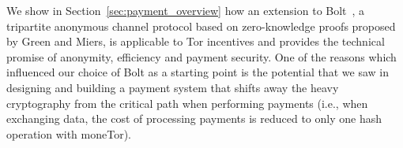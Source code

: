  We show in Section~\ref{sec:payment_overview} how an extension to
 Bolt~\cite{green2017bolt}, a tripartite anonymous channel protocol based on
 zero-knowledge proofs proposed by Green and Miers, is applicable to Tor
 incentives and provides the technical promise of anonymity, efficiency and
 payment security.
 One of the reasons which influenced our choice of Bolt as a starting point is the
 potential that we saw in designing and building a payment system that shifts
 away the heavy cryptography from the critical path when performing payments
 (i.e., when exchanging data, the cost of processing payments is reduced to only
 one hash operation with moneTor).


